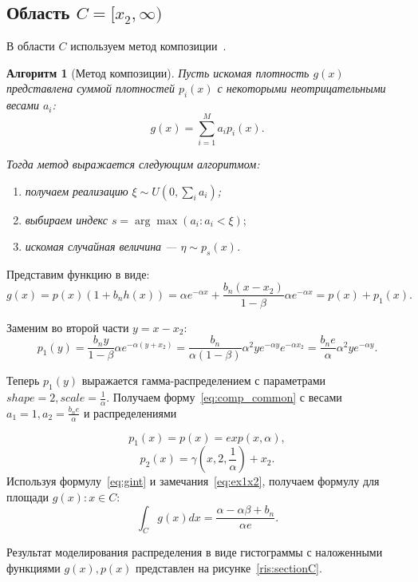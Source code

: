 \documentclass[12pt, specialist, subf, substylefile = spbu.rtx]{disser}
\newtheorem{algo}{Алгоритм}
\begin{document}

\subsection{Область $C=[x_2, \infty)$}

В области $C$ используем метод композиции~\cite{MonErm}. 

\begin{algo}[Метод композиции]\label{alg:comp}
Пусть искомая плотность $g(x)$ представлена суммой плотностей $p_i(x)$ с некоторыми неотрицательными весами $a_i$:
\begin{equation}\label{eq:comp_common}
g(x)=\sum\limits_{i=1}^M a_ip_i(x).
\end{equation}

Тогда метод выражается следующим алгоритмом:
\begin{enumerate}
\item получаем реализацию $\xi \sim U(0, \sum_i a_i)$;
\item выбираем индекс $s=\arg\max(a_i:a_i<\xi);$
\item искомая случайная величина --- $\eta \sim p_s(x)$.
\end{enumerate}
\end{algo}


Представим функцию в виде:
$$
g(x)=p(x)(1+b_nh(x))=\alpha e^{-\alpha x} + \frac{b_n(x-x_2)}{1-\beta}\alpha e^{-\alpha x}=p(x)+p_1(x).
$$

Заменим во второй части $y=x-x_2$:
$$
p_1(y)=\frac{b_ny}{1-\beta}\alpha e^{-\alpha (y+x_2)}=
\frac{b_n}{\alpha(1-\beta)}\alpha^2 ye^{-\alpha y}e^{-\alpha x_2}=
\frac{b_ne}{\alpha}\alpha^2 ye^{-\alpha y}.
$$

Теперь $p_1(y)$ выражается гамма-распределением с параметрами $shape=2, scale=\frac{1}{\alpha}$. Получаем форму~\eqref{eq:comp_common} с весами $a_1=1, a_2=\frac{b_ne}{\alpha}$ и распределениями 

$$
p_1(x)=p(x)=exp(x, \alpha),
$$ 
$$
p_2(x)=\gamma(x, 2, \frac{1}{\alpha})+x_2.
$$
Используя формулу~\eqref{eq:gint} и замечания~\eqref{eq:ex1x2}, получаем формулу для площади $g(x):x \in C$:
$$
\int_C g(x)dx=\frac{\alpha-\alpha\beta+b_n}{\alpha e}.
$$

Результат моделирования распределения в виде гистограммы с наложенными функциями $g(x), p(x)$ представлен на рисунке~\ref{ris:sectionC}. 
\end{document}

